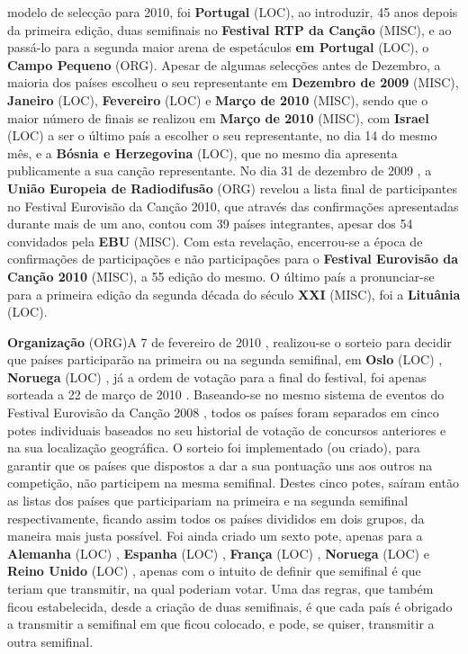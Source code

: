 \documentclass[12pt,a4paper]{article}
\begin{document}
modelo de selecção para 2010, foi \textbf{Portugal} (LOC), ao introduzir, 45 anos depois da primeira edição, duas semifinais no \textbf{Festival RTP da Canção} (MISC), e ao passá-lo para a segunda maior arena de espetáculos \textbf{em Portugal} (LOC), o \textbf{Campo Pequeno} (ORG). Apesar de algumas selecções antes de Dezembro, a maioria dos países escolheu o seu representante em \textbf{Dezembro de 2009} (MISC), \textbf{Janeiro} (LOC), \textbf{Fevereiro} (LOC) e \textbf{Março de 2010} (MISC), sendo que o maior número de finais se realizou em \textbf{Março de 2010} (MISC), com \textbf{Israel} (LOC) a ser o último país a escolher o seu representante, no dia 14 do mesmo mês, e a \textbf{Bósnia e Herzegovina} (LOC), que no mesmo dia apresenta publicamente a sua canção representante. No dia 31 de dezembro de 2009 , a \textbf{União Europeia de Radiodifusão} (ORG) revelou a lista final de participantes no Festival Eurovisão da Canção 2010, que através das confirmações apresentadas durante mais de um ano, contou com 39 países integrantes, apesar dos 54 convidados pela \textbf{EBU} (MISC). Com esta revelação, encerrou-se a época de confirmações de participações e não participações para o \textbf{Festival Eurovisão da Canção 2010} (MISC), a 55 edição do mesmo. O último país a pronunciar-se para a primeira edição da segunda década do século \textbf{XXI} (MISC), foi a \textbf{Lituânia} (LOC).



\textbf{Organização} (ORG)A 7 de fevereiro de 2010 , realizou-se o sorteio para decidir que países participarão na primeira ou na segunda semifinal, em \textbf{Oslo} (LOC) , \textbf{Noruega} (LOC) , já a ordem de votação para a final do festival, foi apenas sorteada a 22 de março de 2010 . Baseando-se no mesmo sistema de eventos do Festival Eurovisão da Canção 2008 , todos os países foram separados em cinco potes individuais baseados no seu historial de votação de concursos anteriores e na sua localização geográfica. O sorteio foi implementado (ou criado), para garantir que os países que dispostos a dar a sua pontuação uns aos outros na competição, não participem na mesma semifinal. Destes cinco potes, saíram então as listas dos países que participariam na primeira e na segunda semifinal respectivamente, ficando assim todos os países divididos em dois grupos, da maneira mais justa possível. Foi ainda criado um sexto pote, apenas para a \textbf{Alemanha} (LOC) , \textbf{Espanha} (LOC) , \textbf{França} (LOC) , \textbf{Noruega} (LOC) e \textbf{Reino Unido} (LOC) , apenas com o intuito de definir que semifinal é que teriam que transmitir, na qual poderiam votar. Uma das regras, que também ficou estabelecida, desde a criação de duas semifinais, é que cada país é obrigado a transmitir a semifinal em que ficou colocado, e pode, se quiser, transmitir a outra semifinal.
\end{document}
